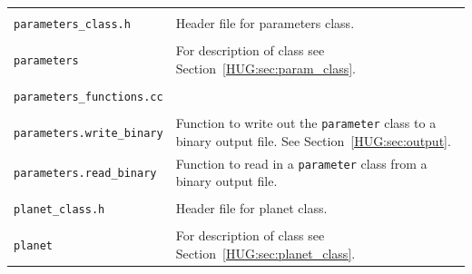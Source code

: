 \documentclass[11pt, oneside]{article}   	%
\begin{document}
\begin{longtable}{l p{10cm}}
\multicolumn{2}{l}{} \\
\texttt{parameters\_class.h} & Header file for parameters class. \\
\hline \\
\texttt{parameters} & For description of class see Section~\ref{HUG:sec:param_class}. \\

\multicolumn{2}{l}{} \\
\multicolumn{2}{l}{\texttt{parameters\_functions.cc}} \\
\hline \\
\texttt{parameters.write\_binary} & Function to write out the \texttt{parameter} class to a binary output file. See Section~\ref{HUG:sec:output}. \\
\texttt{parameters.read\_binary} & Function to read in a \texttt{parameter} class from a binary output file. \\

\multicolumn{2}{l}{} \\
\texttt{planet\_class.h} & Header file for planet class. \\
\hline \\
\texttt{planet} & For description of class see Section~\ref{HUG:sec:planet_class}.\\


\end{longtable}
\end{document}
